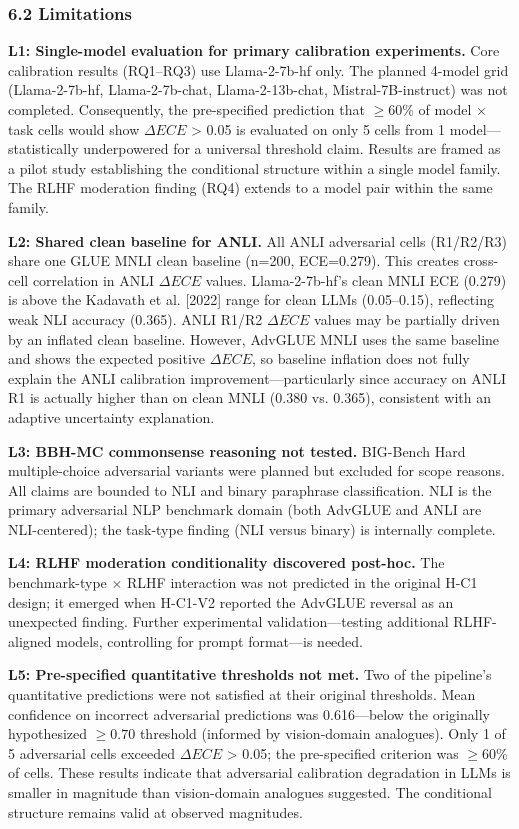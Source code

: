\subsubsection{6.2 Limitations}

\textbf{L1: Single-model evaluation for primary calibration experiments.} Core calibration results (RQ1--RQ3) use Llama-2-7b-hf only. The planned 4-model grid (Llama-2-7b-hf, Llama-2-7b-chat, Llama-2-13b-chat, Mistral-7B-instruct) was not completed. Consequently, the pre-specified prediction that $\geq 60$\% of model $\times$ task cells would show $\Delta ECE$ > 0.05 is evaluated on only 5 cells from 1 model---statistically underpowered for a universal threshold claim. Results are framed as a pilot study establishing the conditional structure within a single model family. The RLHF moderation finding (RQ4) extends to a model pair within the same family.

\textbf{L2: Shared clean baseline for ANLI.} All ANLI adversarial cells (R1/R2/R3) share one GLUE MNLI clean baseline (n=200, ECE=0.279). This creates cross-cell correlation in ANLI $\Delta ECE$ values. Llama-2-7b-hf's clean MNLI ECE (0.279) is above the Kadavath et al. [2022] range for clean LLMs (0.05--0.15), reflecting weak NLI accuracy (0.365). ANLI R1/R2 $\Delta ECE$ values may be partially driven by an inflated clean baseline. However, AdvGLUE MNLI uses the same baseline and shows the expected positive $\Delta ECE$, so baseline inflation does not fully explain the ANLI calibration improvement---particularly since accuracy on ANLI R1 is actually higher than on clean MNLI (0.380 vs. 0.365), consistent with an adaptive uncertainty explanation.

\textbf{L3: BBH-MC commonsense reasoning not tested.} BIG-Bench Hard multiple-choice adversarial variants were planned but excluded for scope reasons. All claims are bounded to NLI and binary paraphrase classification. NLI is the primary adversarial NLP benchmark domain (both AdvGLUE and ANLI are NLI-centered); the task-type finding (NLI versus binary) is internally complete.

\textbf{L4: RLHF moderation conditionality discovered post-hoc.} The benchmark-type $\times$ RLHF interaction was not predicted in the original H-C1 design; it emerged when H-C1-V2 reported the AdvGLUE reversal as an unexpected finding. Further experimental validation---testing additional RLHF-aligned models, controlling for prompt format---is needed.

\textbf{L5: Pre-specified quantitative thresholds not met.} Two of the pipeline's quantitative predictions were not satisfied at their original thresholds. Mean confidence on incorrect adversarial predictions was 0.616---below the originally hypothesized $\geq 0.70$ threshold (informed by vision-domain analogues). Only 1 of 5 adversarial cells exceeded $\Delta ECE$ > 0.05; the pre-specified criterion was $\geq 60$\% of cells. These results indicate that adversarial calibration degradation in LLMs is smaller in magnitude than vision-domain analogues suggested. The conditional structure remains valid at observed magnitudes.

